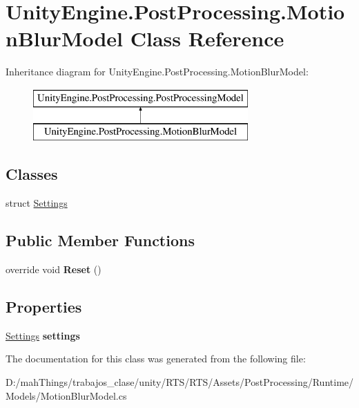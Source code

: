 \hypertarget{class_unity_engine_1_1_post_processing_1_1_motion_blur_model}{}\section{Unity\+Engine.\+Post\+Processing.\+Motion\+Blur\+Model Class Reference}
\label{class_unity_engine_1_1_post_processing_1_1_motion_blur_model}
Inheritance diagram for Unity\+Engine.\+Post\+Processing.\+Motion\+Blur\+Model\+:\begin{figure}[H]
\begin{center}
\leavevmode
\includegraphics[height=2.000000cm]{class_unity_engine_1_1_post_processing_1_1_motion_blur_model}
\end{center}
\end{figure}
\subsection*{Classes}
\begin{DoxyCompactItemize}
\item 
struct \mbox{\hyperlink{struct_unity_engine_1_1_post_processing_1_1_motion_blur_model_1_1_settings}{Settings}}
\end{DoxyCompactItemize}
\subsection*{Public Member Functions}
\begin{DoxyCompactItemize}
\item 
\mbox{\label{class_unity_engine_1_1_post_processing_1_1_motion_blur_model_a04196279454910f3f9c840378a80b8c7}} 
override void {\bfseries Reset} ()
\end{DoxyCompactItemize}
\subsection*{Properties}
\begin{DoxyCompactItemize}
\item 
\mbox{\label{class_unity_engine_1_1_post_processing_1_1_motion_blur_model_ac570d8bef9ee96c2728292da1aff5af3}} 
\mbox{\hyperlink{struct_unity_engine_1_1_post_processing_1_1_motion_blur_model_1_1_settings}{Settings}} {\bfseries settings}
\end{DoxyCompactItemize}


The documentation for this class was generated from the following file\+:\begin{DoxyCompactItemize}
\item 
D\+:/mah\+Things/trabajos\+\_\+clase/unity/\+R\+T\+S/\+R\+T\+S/\+Assets/\+Post\+Processing/\+Runtime/\+Models/Motion\+Blur\+Model.\+cs\end{DoxyCompactItemize}
